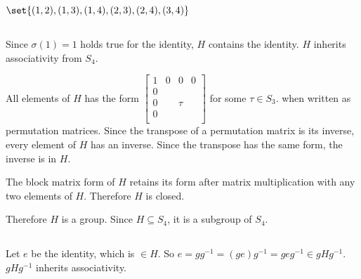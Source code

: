 \section{}
    \subsection{}
        \(
            \set{
                (1,2),
                (1,3),
                (1,4),
                (2,3),
                (2,4),
                (3,4)
            }
        \)
    
    \subsection{}
        Since $\sigma(1) = 1$ holds true for the identity,
        $H$ contains the identity.
        $H$ inherits associativity from $S_4$.

        All elements of $H$ has the form 
        \(
            \left [
                \begin{array}{c|ccc}
                    1 &0 &0 &0 \\
                    \hline
                    0 \\
                    0 & & \tau \\
                    0 \\
                \end{array}
            \right ]
        \) 
        for some $\tau \in S_3$.
        when written as permutation matrices.
        Since the transpose of a permutation matrix is its inverse,
        every element of $H$ has an inverse.
        Since the transpose has the same form, 
        the inverse is in $H$.

        The block matrix form of $H$ retains its form after matrix multiplication
        with any two elements of $H$.
        Therefore $H$ is closed.


        Therefore $H$ is a group. Since $H \subseteq S_4$, it is a subgroup of $S_4$.
    
    \subsection{
    }
        Let $e$ be the identity, which is $\in H$.
        So $e = g g^{-1} = (ge)g^{-1} = geg^{-1} \in gHg^{-1}$.
        $gHg^{-1}$ inherits associativity.
        
